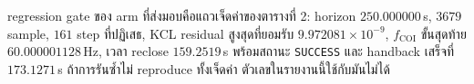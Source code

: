 \documentclass[12pt,a4paper]{article}
\theoremstyle{remark}
\newcommand{\code}[1]{\texttt{\small #1}}
\begin{document}
\noindent
regression gate ของ arm ที่ส่งมอบคือแถวเจ็ดค่าของตารางที่ 2:
horizon $250.000000$\,s, $3679$ sample, $161$ step ที่ปฏิเสธ,
KCL residual สูงสุดที่ยอมรับ $9.972081\times10^{-9}$,
$f_{\mathrm{COI}}$ ขั้นสุดท้าย $60.000001128$\,Hz, เวลา reclose $159.2519$\,s
พร้อมสถานะ \code{SUCCESS} และ handback เสร็จที่ $173.1271$\,s
ถ้าการรันซ้ำไม่ reproduce ทั้งเจ็ดค่า ตัวเลขในรายงานนี้ใช้กับมันไม่ได้
\end{document}
